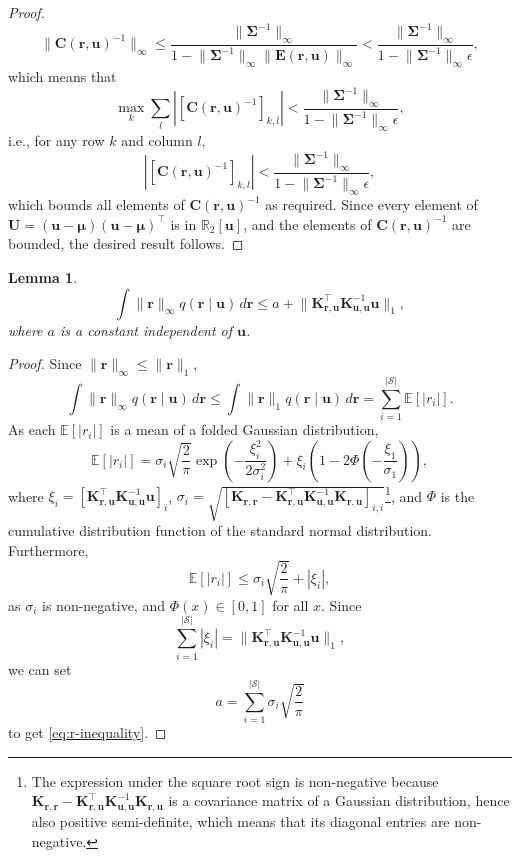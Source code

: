 \documentclass{article}
\newtheorem{lemma}[theorem]{Lemma}
\theoremstyle{definition}
\theoremstyle{remark}
\newcommand{\Kuu}{\mathbf{K}_{\mathbf{u},\mathbf{u}}}
\newcommand{\Krr}{\mathbf{K}_{\mathbf{r},\mathbf{r}}}
\newcommand{\Kru}{\mathbf{K}_{\mathbf{r},\mathbf{u}}}
\newcommand{\rinf}{\lVert \mathbf{r} \rVert_\infty}
\begin{document}
\begin{proof}
  \[
    \lVert \mathbf{C}(\mathbf{r}, \mathbf{u})^{-1} \rVert_\infty \le
    \frac{\lVert \bm\Sigma^{-1} \rVert_\infty}{1 - \lVert \bm\Sigma^{-1}
      \rVert_\infty \lVert \mathbf{E}(\mathbf{r}, \mathbf{u}) \rVert_\infty} <
    \frac{\lVert \bm\Sigma^{-1} \rVert_\infty}{1 - \lVert \bm\Sigma^{-1}
      \rVert_\infty \epsilon},
  \]
  which means that
  \[
    \max_k \sum_l \left| [\mathbf{C}(\mathbf{r}, \mathbf{u})^{-1}]_{k,l} \right|
    < \frac{\lVert \bm\Sigma^{-1} \rVert_\infty}{1 - \lVert \bm\Sigma^{-1}
      \rVert_\infty \epsilon},
  \]
  i.e., for any row $k$ and column $l$,
  \[
    \left| [\mathbf{C}(\mathbf{r}, \mathbf{u})^{-1}]_{k,l} \right| <
    \frac{\lVert \bm\Sigma^{-1} \rVert_\infty}{1 - \lVert \bm\Sigma^{-1}
      \rVert_\infty \epsilon},
  \]
  which bounds all elements of $\mathbf{C}(\mathbf{r}, \mathbf{u})^{-1}$ as
  required. Since every element of $\mathbf{U} = (\mathbf{u} - \bm\mu)(\mathbf{u} -
  \bm\mu)^\intercal$ is in $\mathbb{R}_2[\mathbf{u}]$, and the elements of
  $\mathbf{C}(\mathbf{r}, \mathbf{u})^{-1}$ are bounded, the desired result
  follows.
\end{proof}

\begin{lemma} \label{lemma:integral_of_r}
  \begin{equation} \label{eq:r-inequality}
    \int \lVert \mathbf{r} \rVert_\infty q(\mathbf{r} \mid \mathbf{u})\,d\mathbf{r} \le a +
    \lVert \Kru^\intercal \Kuu^{-1} \mathbf{u} \rVert_1,
  \end{equation}
  where $a$ is a constant independent of $\mathbf{u}$.
\end{lemma}
\begin{proof}
  Since $\rinf \le \lVert \mathbf{r} \rVert_1$,
  \[
    \int \lVert \mathbf{r} \rVert_\infty q(\mathbf{r} \mid \mathbf{u})\,d\mathbf{r} \le \int
    \lVert \mathbf{r} \rVert_1 q(\mathbf{r} \mid \mathbf{u})\,d\mathbf{r} =
    \sum_{i=1}^{|\mathcal{S}|} \mathbb{E}[|r_i|].
  \]
  As each $\mathbb{E}[|r_i|]$ is a mean of a folded Gaussian distribution,
  \[
    \mathbb{E}[|r_i|] = \sigma_i \sqrt{\frac{2}{\pi}} \exp
    \left(-\frac{\xi_i^2}{2\sigma_i^2} \right) + \xi_i \left( 1 - 2\Phi \left(
        -\frac{\xi_1}{\sigma_1} \right) \right),
  \]
  where $\xi_i = \left[\Kru^\intercal\Kuu^{-1}\mathbf{u}\right]_i$, $\sigma_i =
  \sqrt{[\Krr - \Kru^\intercal\Kuu^{-1}\Kru]_{i,i}}$\footnote{The expression
    under the square root sign is non-negative because $\Krr -
    \Kru^\intercal\Kuu^{-1}\Kru$ is a covariance matrix of a Gaussian
    distribution, hence also positive semi-definite, which means that its
    diagonal entries are non-negative.}, and $\Phi$ is the cumulative
  distribution function of the standard normal distribution. Furthermore,
  \[
    \mathbb{E}[|r_i|] \le \sigma_i\sqrt{\frac{2}{\pi}} + |\xi_i|,
  \]
  as $\sigma_i$ is non-negative, and $\Phi(x) \in [0, 1]$ for all $x$. Since
  \[ \sum_{i=1}^{|\mathcal{S}|} |\xi_i| = \lVert \Kru^\intercal \Kuu^{-1}
    \mathbf{u} \rVert_1, \]
  we can set
  \[ a = \sum_{i=1}^{|\mathcal{S}|} \sigma_i \sqrt{\frac{2}{\pi}} \]
  to get \eqref{eq:r-inequality}.
\end{proof}
\end{document}
